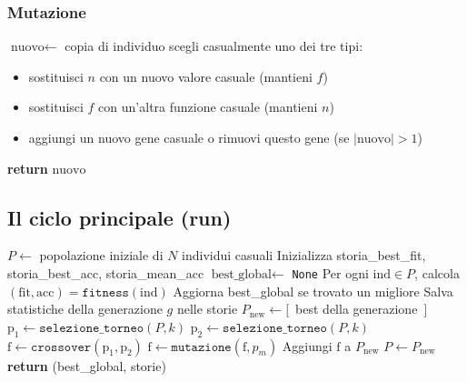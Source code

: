 \documentclass[11pt,a4paper]{article}
\newcommand{\fnt}{\texttt}     %
\begin{document}
\subsubsection{Mutazione}

\begin{algorithm}[H]
\caption{\fnt{mutazione}(individuo, $p_m$)}
\begin{algorithmic}[1]
\State $\text{nuovo} \gets$ copia di individuo
        \State scegli casualmente uno dei tre tipi:
        \begin{itemize}
            \item[\textsc{Tipo 1}] sostituisci $n$ con un nuovo valore casuale (mantieni $f$)
            \item[\textsc{Tipo 2}] sostituisci $f$ con un'altra funzione casuale (mantieni $n$)
            \item[\textsc{Tipo 3}] aggiungi un nuovo gene casuale o rimuovi questo gene (se $|\text{nuovo}|>1$)
        \end{itemize}
    \EndIf
\EndFor
\State \textbf{return} $\text{nuovo}$
\end{algorithmic}
\end{algorithm}

\subsection{Il ciclo principale (run)}

\begin{algorithm}[H]
\caption{\fnt{GeneticAlgorithm.run()}}
\begin{algorithmic}[1]
\State $P \gets$ popolazione iniziale di $N$ individui casuali
\State Inizializza storia\_best\_fit, storia\_best\_acc, storia\_mean\_acc
\State $\text{best\_global} \gets$ \texttt{None}
    \State Per ogni $\text{ind} \in P$, calcola $(\text{fit}, \text{acc}) = \fnt{fitness}(\text{ind})$
    \State Aggiorna best\_global se trovato un migliore
    \State Salva statistiche della generazione $g$ nelle storie
    \State $P_{\text{new}} \gets [\,$ best della generazione $\,]$ 
        \State $\text{p}_1 \gets \fnt{selezione\_torneo}(P, k)$
        \State $\text{p}_2 \gets \fnt{selezione\_torneo}(P, k)$
        \State $\text{f} \gets \fnt{crossover}(\text{p}_1, \text{p}_2)$
        \State $\text{f} \gets \fnt{mutazione}(\text{f}, p_m)$
        \State Aggiungi $\text{f}$ a $P_{\text{new}}$
    \EndWhile
    \State $P \gets P_{\text{new}}$
\EndFor
\State \textbf{return} (best\_global, storie)
\end{algorithmic}
\end{algorithm}
\end{document}

